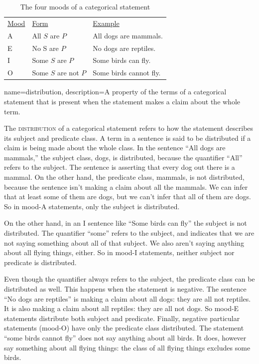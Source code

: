 \begin{table}[t]
\begin{mdframed}[style=mytablebox]
\begin{tabu}{p{.1\linewidth}p{.3\linewidth}p{.3\linewidth}}
  \underline{Mood}& \underline{Form} & \underline{Example} \\ 
A & All $S$ are $P$ & All dogs are mammals. \\
E & No S are $P$ & No dogs are reptiles. \\
I & Some $S$ are $P$ & Some birds can fly. \\
O & Some $S$ are not $P$ & Some birds cannot fly.\\
\end{tabu}
\end{mdframed}
\caption{The four moods of a categorical statement} \label{tab:moods}
\end{table}

{
name=distribution,
description={A property of the terms of a categorical statement that is present when the statement makes a claim about the whole term.}
}

The \textsc{\gls{distribution}} of a categorical statement refers to how the statement describes its subject and predicate class. A term in a sentence is said to be distributed \label{def:Distribution} if a claim is being made about the whole class. In the sentence ``All dogs are mammals,'' the subject class, dogs, is distributed, because the quantifier ``All'' refers to the subject. The sentence is asserting that every dog out there is a mammal. On the other hand, the predicate class, mammals, is not distributed, because the sentence isn't making a claim about all the mammals. We can infer that at least some of them are dogs, but we can't infer that all of them are dogs. So in mood-A statements, only the subject is distributed. 

On the other hand, in an I sentence like ``Some birds can fly'' the subject is not distributed. The quantifier ``some'' refers to the subject, and indicates that we are not saying something about all of that subject. We also aren't saying anything about all flying things, either. So in mood-I statements, neither subject nor predicate is distributed. 

Even though the quantifier always refers to the subject, the predicate class can be distributed as well. This happens when the statement is negative. The sentence ``No dogs are reptiles'' is making a claim about all dogs: they are all not reptiles. It is also making a claim about all reptiles: they are all not dogs. So mood-E statements distribute both subject and predicate. Finally, negative particular statements (mood-O) have only the predicate class distributed. The statement ``some birds cannot fly'' does not say anything about all birds. It does, however say something about all flying things: the class of all flying things excludes some birds. 

